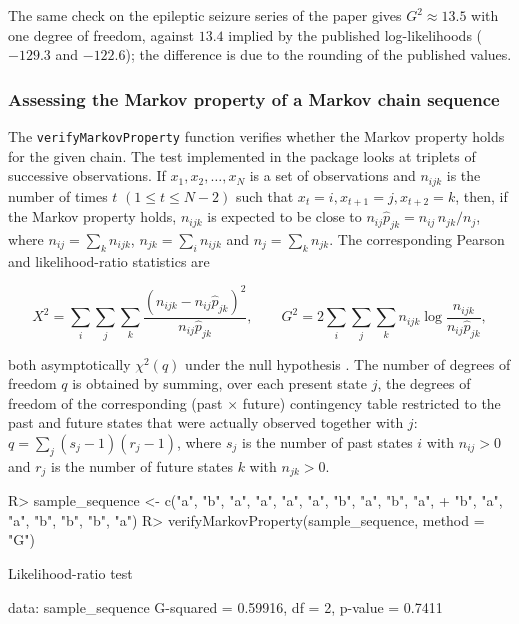\documentclass[
  nojss]{jss}
\begin{document}
The same check on the epileptic seizure series of the paper gives \(G^2\approx13.5\) with one degree of freedom, against \(13.4\) implied by the published log-likelihoods (\(-129.3\) and \(-122.6\)); the difference is due to the rounding of the published values.

\subsubsection{Assessing the Markov property of a Markov chain sequence}\label{assessing-the-markov-property-of-a-markov-chain-sequence}

The \texttt{verifyMarkovProperty} function verifies whether the Markov property holds for the given chain. The test implemented in the package looks at triplets of successive observations. If \(x_1, x_2, \ldots, x_N\) is a set of observations and \(n_{ijk}\) is the number of times \(t\) \(\left(1 \le t \le N-2 \right)\) such that \(x_t=i, x_{t+1}=j, x_{t+2}=k\), then, if the Markov property holds, \(n_{ijk}\) is expected to be close to \(n_{ij}\hat p_{jk} = n_{ij}\,n_{jk}/n_j\), where \(n_{ij}=\sum_k n_{ijk}\), \(n_{jk}=\sum_i n_{ijk}\) and \(n_j = \sum_k n_{jk}\). The corresponding Pearson and likelihood-ratio statistics are

\[
X^2=\sum_{i}\sum_{j}\sum_{k}\frac{(n_{ijk}-n_{ij}\hat{p}_{jk})^2}{n_{ij}\hat{p}_{jk}}, \qquad
G^2=2\sum_{i}\sum_{j}\sum_{k} n_{ijk}\log\frac{n_{ijk}}{n_{ij}\hat{p}_{jk}},
\]

both asymptotically \(\chi^2(q)\) under the null hypothesis \citep{anderson1957statistical}. The number of degrees of freedom \(q\) is obtained by summing, over each present state \(j\), the degrees of freedom of the corresponding (past \(\times\) future) contingency table restricted to the past and future states that were actually observed together with \(j\): \(q=\sum_j (s_j-1)(r_j-1)\), where \(s_j\) is the number of past states \(i\) with \(n_{ij}>0\) and \(r_j\) is the number of future states \(k\) with \(n_{jk}>0\).

\begin{CodeChunk}
\begin{CodeInput}
R> sample_sequence <- c("a", "b", "a", "a", "a", "a", "b", "a", "b", "a", 
+                      "b", "a", "a", "b", "b", "b", "a")
R> verifyMarkovProperty(sample_sequence, method = "G")
\end{CodeInput}
\begin{CodeOutput}

    Likelihood-ratio test

data:  sample_sequence
G-squared = 0.59916, df = 2, p-value = 0.7411
\end{CodeOutput}
\end{CodeChunk}
\end{document}
